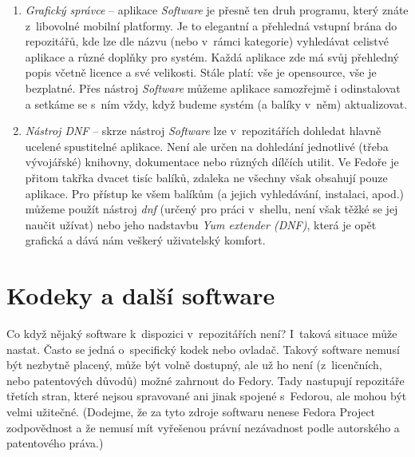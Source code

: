 \begin{enumerate}
\item \emph{Grafický správce} -- aplikace \emph{Software} je přesně ten druh programu, který znáte z~libovolné mobilní platformy. Je to elegantní a přehledná vstupní brána do repozitářů, kde lze dle názvu (nebo v~rámci kategorie) vyhledávat celistvé aplikace a různé doplňky pro systém. Každá aplikace zde má svůj přehledný popis včetně licence a své velikosti. Stále platí: vše je opensource, vše je bezplatné. Přes nástroj \emph{Software} můžeme aplikace samozřejmě i odinstalovat a setkáme se s~ním vždy, když budeme systém (a balíky v~něm) aktualizovat.

\item \emph{Nástroj DNF} -- skrze nástroj \emph{Software} lze v~repozitářích dohledat hlavně ucelené spustitelné aplikace. Není ale určen na dohledání jednotlivé (třeba vývojářské) knihovny, dokumentace nebo různých dílčích utilit. Ve Fedoře je přitom takřka dvacet tisíc balíků, zdaleka ne všechny však obsahují pouze aplikace. Pro přístup ke všem balíkům (a jejich vyhledávání, instalaci, apod.) můžeme použít nástroj \emph{dnf} (určený pro práci v~shellu, není však těžké se jej naučit užívat) nebo jeho nadstavbu \emph{Yum extender (DNF)}, která je opět grafická a dává nám veškerý uživatelský komfort.
\end{enumerate}

\section*{Kodeky a další software}
Co když nějaký software k~dispozici v~repozitářích není? I~taková situace může nastat. Často se jedná o~specifický kodek nebo ovladač. Takový software nemusí být nezbytně placený, může být volně dostupný, ale už ho není (z~licenčních, nebo patentových důvodů) možné zahrnout do Fedory. Tady nastupují repozitáře třetích stran, které nejsou spravované ani jinak spojené s~Fedorou, ale mohou být velmi užitečné. (Dodejme, že za tyto zdroje softwaru nenese Fedora Project zodpovědnost a že nemusí mít vyřešenou právní nezávadnost podle autorského a patentového práva.)

